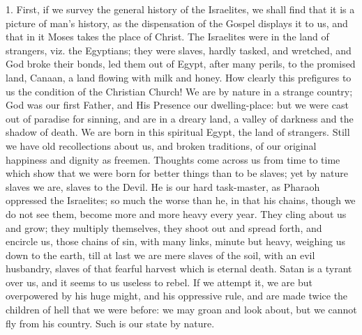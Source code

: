 1. First, if we survey the general history of the Israelites, we
shall find that it is a picture of man's history, as the dispensation
of the Gospel displays it to us, and that in it Moses takes the place
of Christ. The Israelites were in the land of strangers, viz. the
Egyptians; they were slaves, hardly tasked, and wretched, and God
broke their bonds, led them out of Egypt, after many perils, to the
promised land, Canaan, a land flowing with milk and honey. How clearly
this prefigures to us the condition of the Christian Church! We are by
nature in a strange country; God was our first Father, and His
Presence our dwelling-place: but we were cast out of paradise for
sinning, and are in a dreary land, a valley of darkness and the shadow
of death. We are born in this spiritual Egypt, the land of strangers.
Still we have old recollections about us, and broken traditions, of
our original happiness and dignity as freemen. Thoughts come across us
from time to time which show that we were born for better things than
to be slaves; yet by nature slaves we are, slaves to the Devil. He is
our hard task-master, as Pharaoh oppressed the Israelites; so much the
worse than he, in that his chains, though we do not see them, become
more and more heavy every year. They cling about us and grow; they
multiply themselves, they shoot out and spread forth, and encircle us,
those chains of sin, with many links, minute but heavy, weighing us
down to the earth, till at last we are mere slaves of the soil, with
an evil husbandry, slaves of that fearful harvest which is eternal
death. Satan is a tyrant over us, and it seems to us useless to rebel.
If we attempt it, we are but overpowered by his huge might, and his
oppressive rule, and are made twice the children of hell that we were
before: we may groan and look about, but we cannot fly from his
country. Such is our state by nature.

